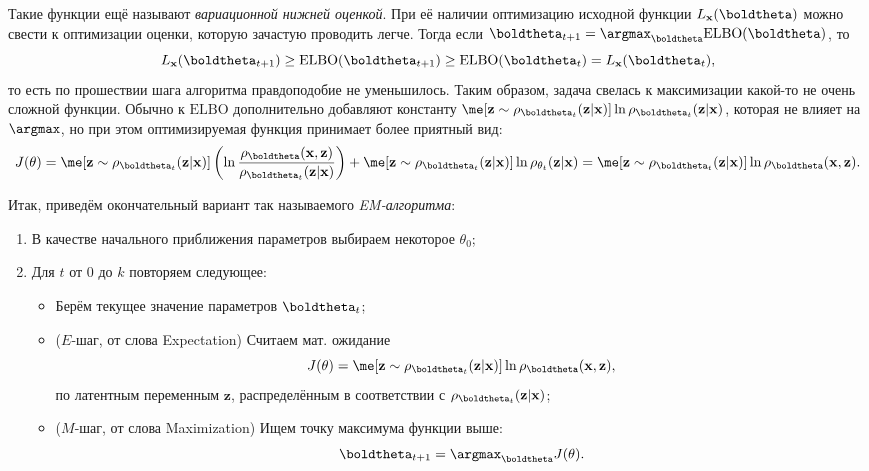 Такие функции ещё называют \textit{вариационной нижней оценкой}. При её наличии оптимизацию исходной функции $L_{\mathbf x}(\boldtheta)$ можно свести к оптимизации оценки, которую зачастую проводить легче. Тогда если $\boldtheta_{t+1} = \argmax_{\boldtheta} \mathrm{ELBO}(\boldtheta)$, то
\[
L_{\mathbf x}(\boldtheta_{t+1}) \ge \mathrm{ELBO}(\boldtheta_{t+1}) \ge \mathrm{ELBO}(\boldtheta_{t}) = L_{\mathbf x}(\boldtheta_{t}),
\]
то есть по прошествии шага алгоритма правдоподобие не уменьшилось. Таким образом, задача свелась к максимизации какой-то не очень сложной функции. Обычно к $\mathrm{ELBO}$ дополнительно добавляют константу $\me[\mathbf z \sim \rho_{\boldtheta_t}(\mathbf z | \mathbf x)]\ln \rho_{\boldtheta_t}(\mathbf z | \mathbf x)$, которая не влияет на $\argmax$, но при этом оптимизируемая функция принимает более приятный вид:
\[
J(\theta) = \me[\mathbf z \sim \rho_{\boldtheta_t}(\mathbf z | \mathbf x)] \left(\ln  \frac{\rho_{\boldtheta}(\mathbf x, \mathbf z)}{\rho_{\boldtheta_t}(\mathbf z | \mathbf x)}\right) + \me[\mathbf z \sim \rho_{\boldtheta_t}(\mathbf z | \mathbf x)]\ln \rho_{\theta_t}(\mathbf z | \mathbf x) = \me[\mathbf z \sim \rho_{\boldtheta_t}(\mathbf z | \mathbf x)] \ln \rho_{\boldtheta}(\mathbf x, \mathbf z).
\]

Итак, приведём окончательный вариант так называемого \textit{EM-алгоритма}:
\begin{enumerate}
	\item В качестве начального приближения параметров выбираем некоторое $\theta_0$;
	\item Для $t$ от 0 до $k$ повторяем следующее:
	\begin{itemize}
		\item Берём текущее значение параметров $\boldtheta_t$;
		\item ($E$-шаг, от слова \textsf{Expectation}) Считаем мат. ожидание
		\[
		J(\theta) = \me[\mathbf z \sim \rho_{\boldtheta_t}(\mathbf z | \mathbf x)] \ln \rho_{\boldtheta}(\mathbf x, \mathbf z),
		\]
		по латентным переменным $\mathbf z$, распределённым в соответствии с $\rho_{\boldtheta_t}(\mathbf z | \mathbf x)$;
		\item ($M$-шаг, от слова \textsf{Maximization}) Ищем точку максимума функции выше:
		$$
		\boldtheta_{t+1} = \argmax_{\boldtheta} J(\theta).
		$$
	\end{itemize}
\end{enumerate}

